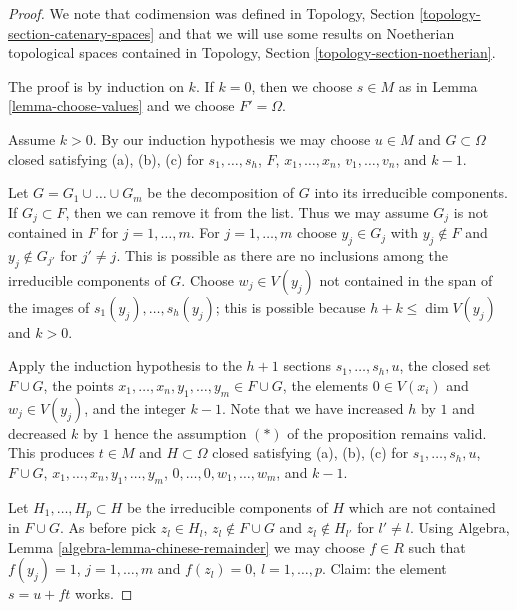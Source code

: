 \begin{proof}
We note that codimension was defined in
Topology, Section \ref{topology-section-catenary-spaces}
and that we will use some results on Noetherian topological
spaces contained in
Topology, Section \ref{topology-section-noetherian}.

\medskip\noindent
The proof is by induction on $k$. If $k = 0$, then we choose
$s \in M$ as in Lemma \ref{lemma-choose-values} and we choose
$F' = \Omega$.

\medskip\noindent
Assume $k > 0$. By our induction hypothesis we may
choose $u \in M$ and $G \subset \Omega$ closed satisfying
(a), (b), (c) for $s_1, \ldots, s_h$, $F$, $x_1, \ldots, x_n$,
$v_1, \ldots, v_n$, and $k - 1$.

\medskip\noindent
Let $G = G_1 \cup \ldots \cup G_m$ be the decomposition of $G$ into
its irreducible components. If $G_j \subset F$, then we can remove
it from the list. Thus we may assume $G_j$ is not contained in $F$
for $j = 1, \ldots, m$.
For $j = 1, \ldots, m$ choose $y_j \in G_j$ with $y_j \not \in F$
and $y_j \not \in G_{j'}$ for $j' \not = j$. This is possible as
there are no inclusions among the irreducible components of $G$.
Choose $w_j \in V(y_j)$ not contained in the span of the images of
$s_1(y_j), \ldots, s_h(y_j)$; this is possible because
$h + k \leq \dim V(y_j)$ and $k > 0$.

\medskip\noindent
Apply the induction hypothesis to the $h + 1$ sections
$s_1, \ldots, s_h, u$, the closed set $F \cup G$,
the points $x_1, \ldots, x_n, y_1, \ldots, y_m \in F \cup G$,
the elements $0 \in V(x_i)$ and $w_j \in V(y_j)$, and
the integer $k - 1$. Note that we have increased $h$ by $1$ and
decreased $k$ by $1$ hence the assumption $(*)$ of the proposition
remains valid. This produces $t \in M$ and $H \subset \Omega$ closed
satisfying (a), (b), (c) for $s_1, \ldots, s_h, u$, $F \cup G$,
$x_1, \ldots, x_n, y_1, \ldots, y_m$, $0, \ldots, 0, w_1, \ldots, w_m$,
and $k - 1$.

\medskip\noindent
Let $H_1, \ldots, H_p \subset H$ be the irreducible components of $H$
which are not contained in $F \cup G$. As before pick $z_l \in H_l$,
$z_l \not \in F \cup G$ and $z_l \not \in H_{l'}$ for $l' \not = l$.
Using Algebra, Lemma \ref{algebra-lemma-chinese-remainder}
we may choose $f \in R$ such that
$f(y_j) = 1$, $j = 1, \ldots, m$ and $f(z_l) = 0$, $l = 1, \ldots, p$.
Claim: the element $s = u + f t$ works.


\end{proof}
